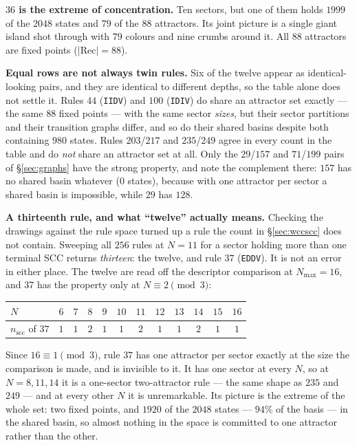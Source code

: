\documentclass[11pt]{article}
\newcommand{\rt}[1]{\texttt{#1}}
\newcommand{\scc}{\mathrm{scc}}
\theoremstyle{plain}
\theoremstyle{definition}
\begin{document}
\noindent\textbf{$36$ is the extreme of concentration.} Ten sectors, but one of
them holds $1999$ of the $2048$ states and $79$ of the $88$ attractors. Its joint
picture is a single giant island shot through with $79$ colours and nine crumbs
around it. All $88$ attractors are fixed points ($|\mathrm{Rec}|=88$).

\noindent\textbf{Equal rows are not always twin rules.} Six of the twelve appear
as identical-looking pairs, and they are identical to different depths, so the
table alone does not settle it. Rules $44$ (\rt{IIDV}) and $100$ (\rt{IDIV}) do
share an attractor set exactly --- the same $88$ fixed points --- with the same
sector \emph{sizes}, but their sector partitions and their transition graphs
differ, and so do their shared basins despite both containing $980$ states.
Rules $203$/$217$ and $235$/$249$ agree in every count in the table and do
\emph{not} share an attractor set at all. Only the $29$/$157$ and $71$/$199$
pairs of \S\ref{sec:graphs} have the strong property, and note the complement
there: $157$ has no shared basin whatever ($0$ states), because with one
attractor per sector a shared basin is impossible, while $29$ has $128$.

\noindent\textbf{A thirteenth rule, and what ``twelve'' actually means.}
Checking the drawings against the rule space turned up a rule the count in
\S\ref{sec:wccscc} does not contain. Sweeping all $256$ rules at $N=11$ for a
sector holding more than one terminal SCC returns \emph{thirteen}: the twelve,
and rule $37$ (\rt{EDDV}). It is not an error in either place. The twelve are
read off the descriptor comparison at $N_{\max}=16$, and $37$ has the property
only at $N\equiv2\pmod 3$:
\begin{center}\small
\begin{tabular}{lccccccccccc}
\toprule
$N$ & $6$ & $7$ & $8$ & $9$ & $10$ & $11$ & $12$ & $13$ & $14$ & $15$ & $16$ \\
\midrule
$n_\scc$ of $37$ & $1$ & $1$ & $2$ & $1$ & $1$ & $2$ & $1$ & $1$ & $2$ & $1$ & $1$ \\
\bottomrule
\end{tabular}
\end{center}
Since $16\equiv1\pmod 3$, rule $37$ has one attractor per sector exactly at the
size the comparison is made, and is invisible to it. It has one sector at every
$N$, so at $N=8,11,14$ it is a one-sector two-attractor rule --- the same shape
as $235$ and $249$ --- and at every other $N$ it is unremarkable. Its picture is
the extreme of the whole set: two fixed points, and $1920$ of the $2048$ states
--- $94\%$ of the basis --- in the shared basin, so almost nothing in the space
is committed to one attractor rather than the other.
\end{document}
